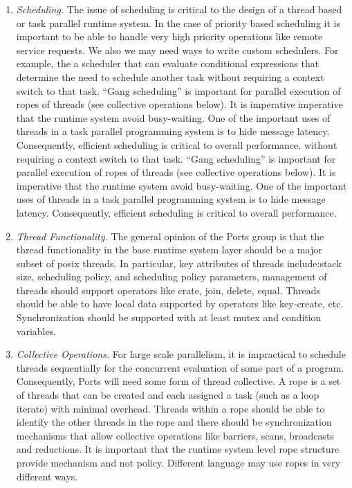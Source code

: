 \begin{enumerate}
\item
{\em Scheduling.}  The issue of scheduling is critical to
the design of a thread based or task parallel runtime system.
In the case of priority based scheduling it is important to
be able to handle very high priority operations like
remote service requests.  We also we may need ways
to write custom schedulers.  For example, the a scheduler
that can evaluate conditional expressions that determine
the need to schedule another task without requiring a context
switch to that task.  ``Gang scheduling'' is important for 
parallel execution of ropes of threads (see collective operations
below).  It is imperativeimperative that the runtime system avoid 
busy-waiting.  One of the important uses of threads in
a task parallel programming system is to hide message latency.
Consequently, efficient scheduling is critical to overall performance.
 without requiring a context
switch to that task.  ``Gang scheduling'' is important for 
parallel execution of ropes of threads (see collective operations
below).  It is imperative that the runtime system avoid 
busy-waiting.  One of the important uses of threads in
a task parallel programming system is to hide message latency.
Consequently, efficient scheduling is critical to overall performance.

\item
{\em Thread Functionality.}  The general opinion of the Ports group
is that the thread functionality in the base runtime system layer
should be a major subset of  posix threads.  In particular, 
key attributes of threads include:stack size, scheduling policy, 
and scheduling policy parameters, management of threads 
should support  operators like crate, join, delete, equal.
Threads should be able to have local data supported by operators
like key-create, etc.  Synchronization should be supported with
at least mutex and condition variables.


\item
{\em Collective Operations.}  For large scale parallelism, it is
impractical to schedule threads sequentially for the concurrent
evaluation of some part of a program.  Consequently, Ports will
need some form of thread collective.  A rope is a set of threads
that can be created and each assigned a task (such as a loop iterate)
with minimal overhead.  Threads within a rope should be able
to identify the other threads in the rope and there should be
synchronization mechanisms that allow collective operations like
barriers, scans, broadcasts and reductions.  
It is important that the runtime system
level rope structure provide mechanism and not policy.  Different
language may use ropes in very different ways.


\end{enumerate}
